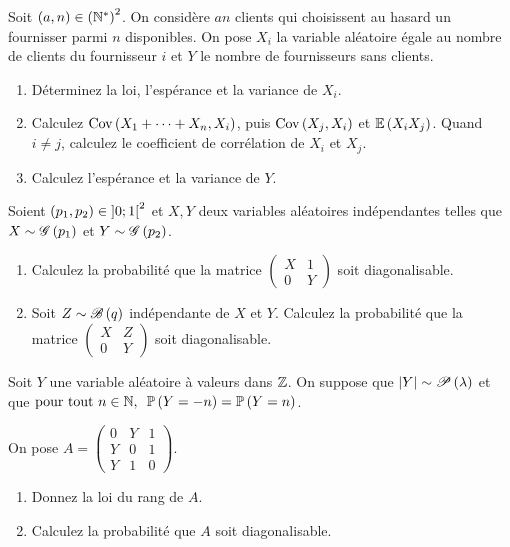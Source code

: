 \begin{exoss}
Soit \(\left(a,n\right)\in\left(\mathbb{N}^*\right)^2\). On considère \(an\) clients qui choisissent au hasard un fournisser parmi \(n\) disponibles. On pose \(X_i\) la variable aléatoire égale au nombre de clients du fournisseur \(i\) et \(Y\) le nombre de fournisseurs sans clients.

\begin{enumerate}
    \item Déterminez la loi, l'espérance et la variance de \(X_i\). \\
    \item Calculez \(\operatorname{Cov}\left(X_1+\dots+X_n,X_i\right)\), puis \(\operatorname{Cov}\left(X_j,X_i\right)\) et \(\operatorname{\mathbb{E}}\left(X_iX_j\right)\). Quand \(i\not=j\), calculez le coefficient de corrélation de \(X_i\) et \(X_j\). \\
    \item Calculez l'espérance et la variance de \(Y\).
\end{enumerate}
\end{exoss}

\begin{exoss}
Soient \(\left(p_1,p_2\right)\in\left]0;1\right[^2\) et \(X,Y\) deux variables aléatoires indépendantes telles que \(X\sim\mathscr{G}\left(p_1\right)\) et \(Y\sim\mathscr{G}\left(p_2\right)\).

\begin{enumerate}
    \item Calculez la probabilité que la matrice \(\begin{pmatrix}
        X & 1 \\
        0 & Y
    \end{pmatrix}\) soit diagonalisable. \\
    \item Soit \(Z\sim\mathscr{B}\left(q\right)\) indépendante de \(X\) et \(Y\). Calculez la probabilité que la matrice \(\begin{pmatrix}
        X & Z \\
        0 & Y
    \end{pmatrix}\) soit diagonalisable.
\end{enumerate}
\end{exoss}

\begin{exoss}
Soit \(Y\) une variable aléatoire à valeurs dans \(\mathbb{Z}\). On suppose que \(\left\lvert Y\right\rvert\sim\mathscr{P}\left(\lambda\right)\) et que \(\quantifs{\tpt n\in\N}\proba{Y=-n}=\proba{Y=n}\).

On pose \(A=\begin{pmatrix}
0 & Y & 1 \\
Y & 0 & 1 \\
Y & 1 & 0
\end{pmatrix}\).

\begin{enumerate}
    \item Donnez la loi du rang de \(A\). \\
    \item Calculez la probabilité que \(A\) soit diagonalisable.
\end{enumerate}
\end{exoss}

